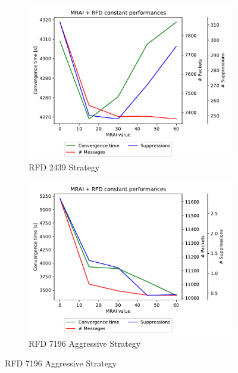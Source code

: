 \begin{figure}[h]
     \centering
     \begin{subfigure}[b]{0.325\textwidth}
         \centering
         \includegraphics[width=\textwidth]{images/RFD/miceVSelephants/MultiMRAI/mice/cisco_1000_RFD_2439-constant_mrai_rfd_evolution.pdf}
         \caption{RFD 2439 Strategy}
         \label{fig:1000_2439RFD_multiMRAI_mice}
     \end{subfigure}
     \hfill
     \begin{subfigure}[b]{0.325\textwidth}
         \centering
         \includegraphics[width=\textwidth]{images/RFD/miceVSelephants/MultiMRAI/mice/cisco_1000_RFD_7196_aggressive-constant_mrai_rfd_evolution.pdf}
         \caption{RFD 7196 Aggressive Strategy}

\end{subfigure}
\end{figure}
